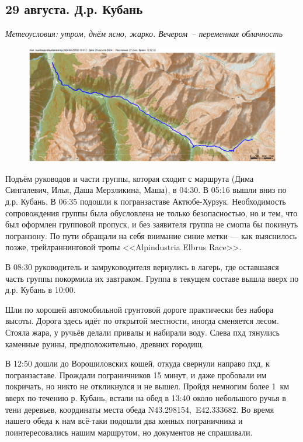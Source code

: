 \subsection{29 августа. Д.р. Кубань}
\textit{Метеоусловия: утром, днём ясно, жарко. Вечером~-- переменная облачность}

\begin{figure}[h!]
	\centering
	\includegraphics[angle=0, width=0.7\linewidth]{../pics/mini_maps/29}
	\label{fig:mini_29}
\end{figure}


Подъём руководов и части группы, которая сходит с маршрута (Дима Сингалевич, Илья, Даша Мерзликина, Маша), в 04:30. В 05:16 вышли вниз по д.р. Кубань. В 06:35 подошли к погранзаставе Актюбе-Хурзук. Необходимость сопровождения группы была обусловлена не только безопасностью, но и тем, что был оформлен групповой пропуск, и без заявителя группа не смогла бы покинуть погранзону. По пути обращали на себя внимание синие метки --- как выяснилось позже, трейлраннинговой тропы <<Alpindustria Elbrus Race>>.

В 08:30 руководитель и замруководителя вернулись в лагерь, где оставшаяся часть группы покормила их завтраком. Группа в текущем составе вышла вверх по д.р. Кубань в 10:00.


Шли по хорошей автомобильной грунтовой дороге практически без набора высоты. Дорога здесь идёт по открытой местности, иногда сменяется лесом. Стояла жара, у ручьёв делали привалы и набирали воду. Слева пхд тянулись каменные руины, предположительно, древних городищ.


В 12:50 дошли до Ворошиловских кошей, откуда свернули направо пхд, к погранзаставе. Прождали пограничников 15 минут, и даже пробовали им покричать, но никто не откликнулся и не вышел. Пройдя немногим более 1~км вверх по течению р. Кубань, встали на обед в 13:40 около небольшого ручья в тени деревьев, координаты места обеда N43.298154\degree,~E42.333682\degree. Во время нашего обеда к нам всё-таки подошли два конных пограничника и поинтересовались нашим маршрутом, но документов не спрашивали.

